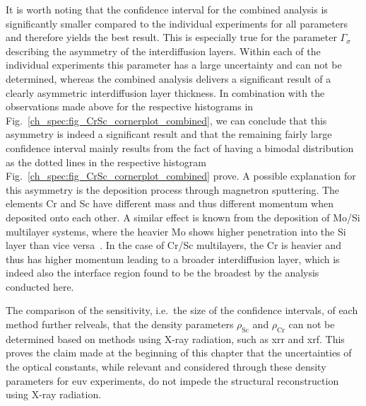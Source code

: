 It is worth noting that the confidence interval for the combined analysis is 
significantly smaller compared to the individual experiments for all parameters and therefore yields the best result. This is especially true for the parameter $\Gamma_\sigma$ describing the asymmetry of the interdiffusion layers. Within each of the individual experiments this parameter has a large uncertainty and can not be determined, whereas the combined analysis delivers a significant result of a clearly asymmetric interdiffusion layer thickness. In combination with the observations made above for the respective histograms in Fig.~\ref{ch_spec:fig_CrSc_cornerplot_combined}, we can conclude that this asymmetry is indeed a significant result and that the remaining fairly large confidence interval mainly results from the fact of having a bimodal distribution as the dotted lines in the respective histogram Fig.~\ref{ch_spec:fig_CrSc_cornerplot_combined} prove. A possible explanation for this asymmetry is the deposition process through magnetron sputtering. The elements Cr and Sc have different mass and thus different momentum when deposited onto each other. A similar effect is known from the deposition of Mo/Si multilayer systems, where the heavier Mo shows higher penetration into the Si layer than vice versa~\cite{petford-long_highresolution_1987}. In the case of Cr/Sc multilayers, the Cr is heavier and thus has higher momentum leading to a broader interdiffusion layer, which is indeed also the interface region found to be the broadest by the analysis conducted here.

The comparison of the sensitivity, i.e.~the size of the confidence intervals, of each method further relveals, that the density parameters $\rho_\text{Sc}$ and $\rho_\text{Cr}$ can not be determined based on methods using X-ray radiation, such as \gls{xrr} and \gls{xrf}. This proves the claim made at the beginning of this chapter that the uncertainties of the optical constants, while relevant and considered through these density parameters for \gls{euv} experiments, do not impede the structural reconstruction using X-ray radiation.

